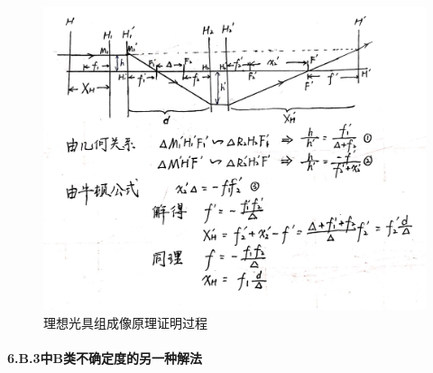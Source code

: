 \documentclass[UTF8]{ctexart}
\begin{document}
\begin{figure}[H]
    \begin{center}
    \includegraphics[scale=0.15]{4.jpg}\vspace{-2.5em}
    \caption{理想光具组成像原理证明过程}
    \end{center}
\end{figure}


\paragraph{6.\quad B.3中B类不确定度的另一种解法}\quad\par
\end{document}
